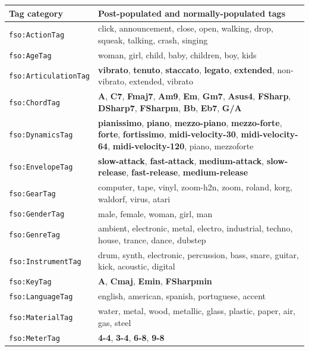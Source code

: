 \begin{table}
\begin{center}
\footnotesize
\begin{tabular}{@{}lp{10cm}@{}}
\toprule
\textbf{Tag category} & \textbf{Post-populated and normally-populated tags}  \\ 
\midrule 
\texttt{fso:ActionTag} & click, announcement, close, open, walking, drop, squeak, talking, crash, singing \\
\texttt{fso:AgeTag} & woman, girl, child, baby, children, boy, kids \\
\texttt{fso:ArticulationTag} & \textbf{vibrato}, \textbf{tenuto}, \textbf{staccato}, \textbf{legato}, \textbf{extended}, non-vibrato, extended, vibrato \\
\texttt{fso:ChordTag} & \textbf{A}, \textbf{C7}, \textbf{Fmaj7}, \textbf{Am9}, \textbf{Em}, \textbf{Gm7}, \textbf{Asus4}, \textbf{FSharp}, \textbf{DSharp7}, \textbf{FSharpm}, \textbf{Bb}, \textbf{Eb7}, \textbf{G/A} \\
\texttt{fso:DynamicsTag} & \textbf{pianissimo}, \textbf{piano}, \textbf{mezzo-piano}, \textbf{mezzo-forte}, \textbf{forte}, \textbf{fortissimo}, \textbf{midi-velocity-30}, \textbf{midi-velocity-64}, \textbf{midi-velocity-120}, piano, mezzoforte \\
\texttt{fso:EnvelopeTag} & \textbf{slow-attack}, \textbf{fast-attack}, \textbf{medium-attack}, \textbf{slow-release}, \textbf{fast-release}, \textbf{medium-release} \\
\texttt{fso:GearTag} & computer, tape, vinyl, zoom-h2n, zoom, roland, korg, waldorf, virus, atari \\
\texttt{fso:GenderTag} & male, female, woman, girl, man \\
\texttt{fso:GenreTag} & ambient, electronic, metal, electro, industrial, techno, house, trance, dance, dubstep \\
\texttt{fso:InstrumentTag} & drum, synth, electronic, percussion, bass, snare, guitar, kick, acoustic, digital \\
\texttt{fso:KeyTag} & \textbf{A}, \textbf{Cmaj}, \textbf{Emin}, \textbf{FSharpmin} \\
\texttt{fso:LanguageTag} & english, american, spanish, portuguese, accent \\
\texttt{fso:MaterialTag} & water, metal, wood, metallic, glass, plastic, paper, air, gas, steel \\
\texttt{fso:MeterTag} & \textbf{4-4}, \textbf{3-4}, \textbf{6-8}, \textbf{9-8} \\

\end{tabular}
\end{center}
\end{table}
